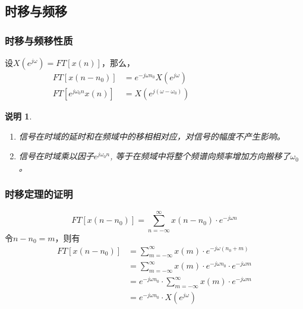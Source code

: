 \documentclass[notheorems,compress,mathserif,table]{beamer}
\newtheorem{shuoming}{说明}
\begin{document}
\subsection*{时移与频移}
\begin{frame}\frametitle{时移与频移性质}%

设$X(e^{j\omega})= FT[x(n)]$，那么，%
\begin{equation*}
\begin{split}
FT[x(n-n_{0})]           &= e^{-j\omega n_{0}}X(e^{j\omega})    \\
FT[e^{j\omega_{0}n}x(n)] &= X(e^{j(\omega-\omega_{0})})\qquad\qquad\qquad\qquad
\end{split}
\end{equation*}
\begin{shuoming}
\begin{enumerate}
\item 信号在时域的延时和在频域中的移相相对应，对信号的幅度不产生影响。
\item 信号在时域乘以因子$e^{j\omega_{0}n}$, 等于在频域中将整个频谱向频率增加方向搬移了$\omega_{0}$。
\end{enumerate}
\end{shuoming}
\end{frame}



\begin{frame}[shrink]\frametitle{时移定理的证明}%
$$FT[x(n-n_0)] = \sum_{n=-\infty}^{\infty}x(n-n_0)\cdot e^{-j\omega n}$$
\quad\quad 令$n-n_0 = m$，则有
\begin{equation*}
\begin{split}
FT[x(n-n_0)] &= \sum_{m=-\infty}^{\infty}x(m)\cdot e^{-j\omega(n_0 +m)}\\
&= \sum_{m=-\infty}^{\infty}x(m)\cdot e^{-j\omega n_0}\cdot e^{-j\omega m}\\
&= e^{-j\omega n_0}\cdot\sum_{m=-\infty}^{\infty}x(m)\cdot e^{-j\omega m}\\
&= e^{-j\omega n_0}\cdot X(e^{j\omega})
\end{split}
\end{equation*}
\end{frame}
\end{document}
